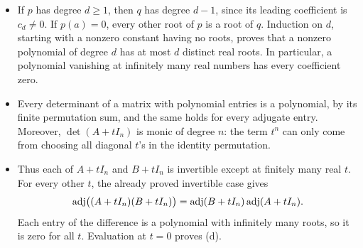 \begin{solution}
\begin{enumerate}
\begin{itemize}
\[
t^k-a^k=(t-a)\sum_{r=0}^{k-1}t^{k-1-r}a^r.
\]
Consequently, for \(p(t)=\sum_{k=0}^d c_kt^k\),
\[
p(t)-p(a)=(t-a)q(t),\qquad
q(t)=\sum_{k=1}^d c_k\sum_{r=0}^{k-1}t^{k-1-r}a^r.
\]
\item If \(p\) has degree \(d\geqslant1\), then \(q\) has degree \(d-1\),
since its leading coefficient is \(c_d\ne0\). If \(p(a)=0\), every other
root of \(p\) is a root of \(q\). Induction on \(d\), starting with a
nonzero constant having no roots, proves that a nonzero polynomial of
degree \(d\) has at most \(d\) distinct real roots. In particular, a
polynomial vanishing at infinitely many real numbers has every coefficient zero.
\label{proof:05:polynomial-bridge}

\item Every determinant of a matrix with polynomial entries is a polynomial,
by its finite permutation sum, and the same holds for every adjugate entry.
Moreover, \(\det(A+tI_n)\) is monic of degree \(n\): the term \(t^n\)
can only come from choosing all diagonal \(t\)'s in the identity permutation.
\item Thus each of \(A+tI_n\) and \(B+tI_n\) is invertible except at finitely
many real \(t\). For every other \(t\), the already proved invertible case gives
\[
\operatorname{adj}\bigl((A+tI_n)(B+tI_n)\bigr)
=\operatorname{adj}(B+tI_n)\operatorname{adj}(A+tI_n).
\]
Each entry of the difference is a polynomial with infinitely many roots,
so it is zero for all \(t\). Evaluation at \(t=0\) proves (d).
\end{itemize}
\end{enumerate}
\end{solution}

